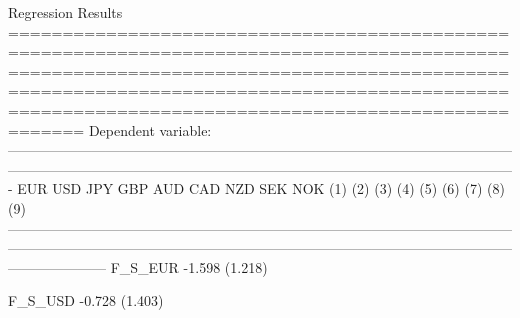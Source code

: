 
Regression Results
=============================================================================================================================================================================================================================================
                                                                                                                       Dependent variable:                                                                                                   
                    -------------------------------------------------------------------------------------------------------------------------------------------------------------------------------------------------------------------------
                              EUR                     USD                     JPY                     GBP                     AUD                      CAD                      NZD                     SEK                     NOK          
                              (1)                     (2)                     (3)                     (4)                     (5)                      (6)                      (7)                     (8)                     (9)          
---------------------------------------------------------------------------------------------------------------------------------------------------------------------------------------------------------------------------------------------
F_S_EUR                     -1.598                                                                                                                                                                                                           
                            (1.218)                                                                                                                                                                                                          
                                                                                                                                                                                                                                             
F_S_USD                                             -0.728                                                                                                                                                                                   
                                                    (1.403)                                                                                                                                                                                  
                                                                                                                                                                                                                                             
